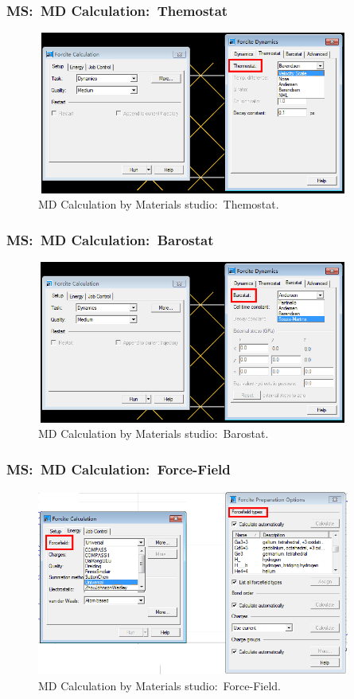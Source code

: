 \frame
{
	\frametitle{\textrm{MS:~MD Calculation:~Themostat}}
\begin{figure}[h!]
\centering
\includegraphics[height=2.10in,width=4.05in,viewport=0 0 723 382,clip]{Figures/MS-MD-Themostat.png}
\caption{\tiny \textrm{MD Calculation by Materials studio:~Themostat.}}%
\label{MS-MD-Dynamics-Themostat}
\end{figure}
}

\frame
{
	\frametitle{\textrm{MS:~MD Calculation:~Barostat}}
\begin{figure}[h!]
\centering
\includegraphics[height=2.10in,width=4.05in,viewport=0 0 724 382,clip]{Figures/MS-MD-Barostat.png}
\caption{\tiny \textrm{MD Calculation by Materials studio:~Barostat.}}%
\label{MS-MD-Dynamics-Barostat}
\end{figure}
}

\frame
{
	\frametitle{\textrm{MS:~MD Calculation:~Force-Field}}
\begin{figure}[h!]
\centering
\includegraphics[height=2.40in,width=4.05in,viewport=0 0 745 440,clip]{Figures/MS-MD-Force-Field.png}
\caption{\tiny \textrm{MD Calculation by Materials studio:~Force-Field.}}%
\label{MS-MD-Dynamics-ForceField}
\end{figure}
}

